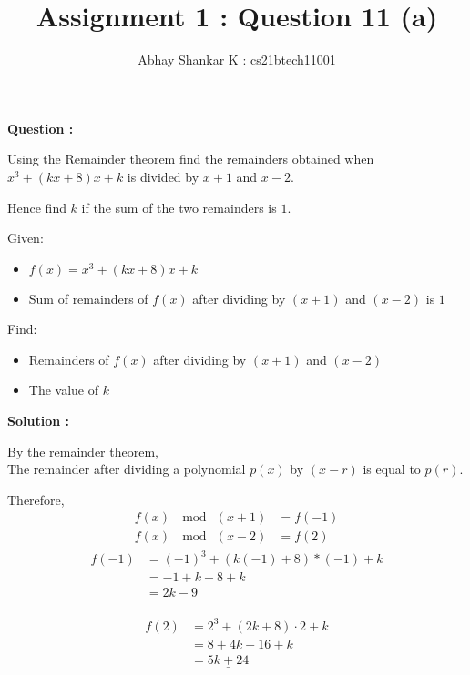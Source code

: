 \documentclass[11pt, oneside, twocolumn]{amsart}   	%
\title{Assignment 1 : Question 11 (a)}
\author{Abhay Shankar K : cs21btech11001}
\begin{document}
\maketitle
\textbf{Question :}

Using the Remainder theorem find the remainders obtained when $x^3 + (kx + 8)x + k$ is divided by $x + 1$ and $x - 2$.

Hence find $k$ if the sum of the two remainders is $1$.

Given:
\begin{itemize}
	\item $f(x) = x^3 + (kx + 8)x + k$ 
	\item Sum of remainders of $f(x)$ after dividing by $(x + 1)$ and $(x - 2)$ is $1$
\end{itemize}
Find:
\begin{itemize}
	\item Remainders of $f(x)$ after dividing by $(x + 1)$ and $(x - 2)$
	\item The value of $k$
\end{itemize}

\textbf{Solution :}

By the remainder theorem, \\
	\quad The remainder after dividing a polynomial $p(x)$ by $(x - r)$ is equal to $p(r)$.

	 Therefore,
	\begin{align}
  		f(x)\ \mod\ (x + 1) &= f(-1) \\
  		f(x)\ \mod\ (x - 2) &= f(2)
	\end{align}
	\begin{align}
 		f(-1) &= (-1)^3 + (k(-1) + 8)*(-1) + k \\
		 &= -1 + k - 8 + k \\
		 &= \underline{2k - 9}
	\end{align}
		
	\begin{align}
		f(2) &= 2^3 + (2k + 8) \cdot 2 + k \\
		  &= 8 + 4k + 16 + k \\
		 &= \underline{5k + 24}
	\end{align}
		  
\end{document}
